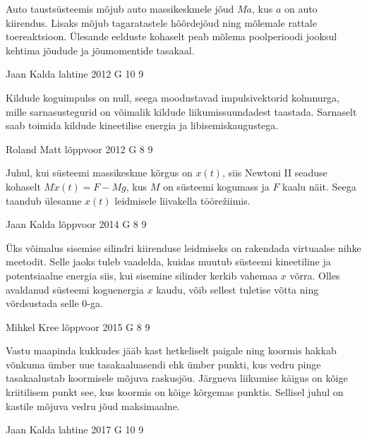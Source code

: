 \documentclass[11pt, twoside]{article}
\begin{document}
{{\ifHint
Auto taustsüsteemis mõjub auto massikeskmele jõud $Ma$, kus $a$ on auto kiirendus. Lisaks mõjub tagaratastele hõõrdejõud ning mõlemale rattale toereaktsioon. Ülesande eelduste kohaselt peab mõlema poolperioodi jooksul kehtima jõudude ja jõumomentide tasakaal.
\fi
}

{Jaan Kalda} %
{lahtine} %
{2012} %
{G 10} %
{9} %
{

\ifHint
Kildude koguimpulss on null, seega moodustavad impulsivektorid kolmnurga, mille sarnasustegurid on võimalik kildude liikumissuundadest taastada. Sarnaselt saab toimida kildude kineetilise energia ja libisemiskaugustega.
\fi
}

{Roland Matt} %
{lõppvoor} %
{2012} %
{G 8} %
{9} %
{

\ifHint
Juhul, kui süsteemi massikeskme kõrgus on $x(t)$, siis Newtoni II seaduse kohaselt $M\ddot{x}(t) = F - Mg$, kus $M$ on süsteemi kogumass ja $F$ kaalu näit. Seega taandub ülesanne $x(t)$ leidmisele liivakella töörežiimis.
\fi
}

{Jaan Kalda} %
{lõppvoor} %
{2014} %
{G 8} %
{9} %
{

\ifHint
Üks võimalus sisemise silindri kiirenduse leidmiseks on rakendada virtuaalse nihke meetodit. Selle jaoks tuleb vaadelda, kuidas muutub süsteemi kineetiline ja potentsiaalne energia siis, kui sisemine silinder kerkib vahemaa $x$ võrra. Olles avaldanud süsteemi koguenergia $x$ kaudu, võib sellest tuletise võtta ning võrdsustada selle \num{0}-ga.
\fi
}

{Mihkel Kree} %
{lõppvoor} %
{2015} %
{G 8} %
{9} %
{

\ifHint
Vastu maapinda kukkudes jääb kast hetkeliselt paigale ning koormis hakkab võnkuma ümber uue tasakaaluasendi ehk ümber punkti, kus vedru pinge tasakaalustab koormisele mõjuva raskusjõu. Järgneva liikumise käigus on kõige kriitilisem punkt see, kus koormis on kõige kõrgemas punktis. Sellisel juhul on kastile mõjuva vedru jõud maksimaalne.
\fi
}

{Jaan Kalda} %
{lahtine} %
{2017} %
{G 10} %
{9} %
{

}}
\end{document}
